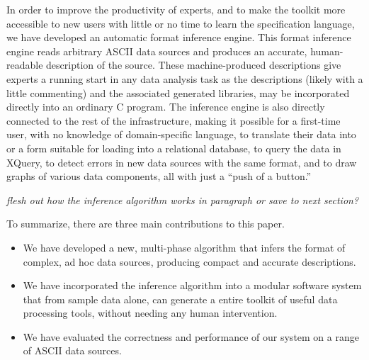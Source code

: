 In order to improve the productivity of experts, and to 
make the \pads{} toolkit more accessible to new users with 
little or no time to learn the specification language,
we have developed an automatic format inference engine.
This format inference engine reads arbitrary ASCII data sources
and produces an accurate, human-readable \pads{} description of the source.
These machine-produced descriptions give experts a running start
in any data analysis task as the descriptions (likely with a little
commenting) and the associated generated libraries, may be 
incorporated directly into an ordinary C program.
The inference engine is also directly connected to the rest of the
\pads{} infrastructure, making it possible for a first-time user,
with no knowledge of \pads{} domain-specific language, to 
translate their data into \xml{} or a form suitable for loading
into a relational database, to query the data in XQuery,
to detect errors in new data sources with the same format,
and to draw graphs of various data components, all
with just a ``push of a button.''

{\em flesh out how the inference algorithm works in paragraph
or save to next section?}

To summarize, there are three main contributions to this paper.

\begin{itemize}
\item We have developed a new, multi-phase algorithm 
that infers the format of complex, ad hoc data sources,
producing compact and accurate \pads{} descriptions.

\item We have incorporated the inference algorithm into 
a modular software system that from sample data alone, can
generate a entire toolkit of useful data processing tools,
without needing any human intervention.
 
\item We have evaluated the correctness and performance of
our system on a range of ASCII data sources.
\end{itemize}





